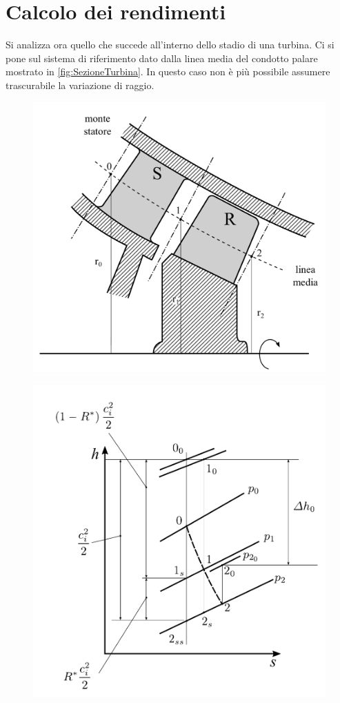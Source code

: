 \section{Calcolo dei rendimenti}
Si analizza ora quello che succede all'interno dello stadio di una turbina. Ci si pone sul sistema di riferimento dato dalla linea media del condotto palare mostrato in \ref{fig:SezioneTurbina}. In questo caso non è più possibile assumere trascurabile la variazione di raggio. 
\begin{figure}
\centering
\begin{minipage}{.5\textwidth}
  \centering
  \includegraphics[width=.95\linewidth]{fig/SezioneTurbina.pdf}
  \label{fig:SezioneTurbina}
\end{minipage}%
\begin{minipage}{.5\textwidth}
  \centering
  \includegraphics[width=.95\linewidth]{fig/hsturbine.pdf}
  \label{fig:hsturbine}
\end{minipage}
\end{figure}
